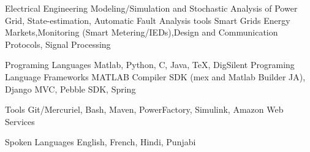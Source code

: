 \begin{cvskills}

\cvskill
{Electrical Engineering}
{Modeling/Simulation and Stochastic Analysis of Power Grid, State-estimation, Automatic Fault Analysis tools}
\cvskill
{Smart Grids}
{Energy Markets,Monitoring (Smart Metering/IEDs),Design and Communication Protocols, Signal Processing}

\cvskill
{Programing Languages}
{Matlab, Python, C, Java, TeX, DigSilent Programing Language}
\cvskill
{Frameworks}
{MATLAB Compiler SDK (mex and Matlab Builder JA), Django MVC, Pebble SDK, Spring}

\cvskill
{Tools}
{Git/Mercuriel, Bash, Maven, PowerFactory, Simulink, Amazon Web Services}

\cvskill
{Spoken Languages}
{English, French, Hindi, Punjabi}

\end{cvskills}
